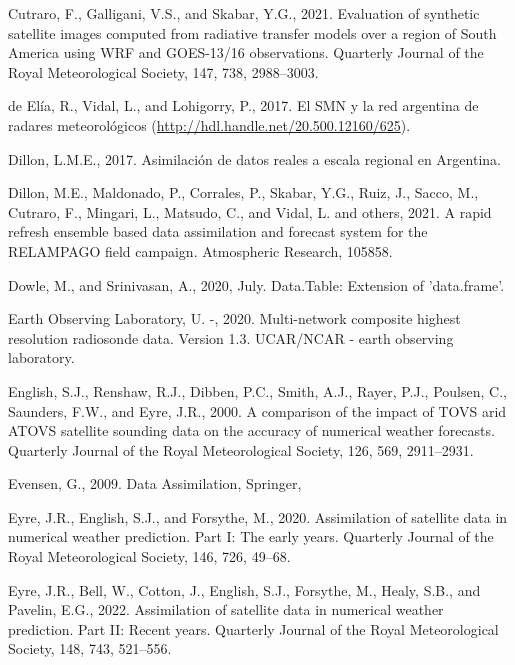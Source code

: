 \documentclass[12pt,oneside]{reedthesis}
\begin{document}
\leavevmode\hypertarget{ref-cutraro2021}{}%
Cutraro, F., Galligani, V.S., and Skabar, Y.G., 2021. Evaluation of synthetic satellite images computed from radiative transfer models over a region of South America using WRF and GOES-13/16 observations. Quarterly Journal of the Royal Meteorological Society, 147, 738, 2988--3003.

\leavevmode\hypertarget{ref-deelia2017}{}%
de Elía, R., Vidal, L., and Lohigorry, P., 2017. El SMN y la red argentina de radares meteorológicos (\url{http://hdl.handle.net/20.500.12160/625}).

\leavevmode\hypertarget{ref-dillon2017}{}%
Dillon, L.M.E., 2017. Asimilación de datos reales a escala regional en Argentina.

\leavevmode\hypertarget{ref-dillon2021}{}%
Dillon, M.E., Maldonado, P., Corrales, P., Skabar, Y.G., Ruiz, J., Sacco, M., Cutraro, F., Mingari, L., Matsudo, C., and Vidal, L. and others, 2021. A rapid refresh ensemble based data assimilation and forecast system for the RELAMPAGO field campaign. Atmospheric Research, 105858.

\leavevmode\hypertarget{ref-dowle2020}{}%
Dowle, M., and Srinivasan, A., 2020, July. Data.Table: Extension of 'data.frame'.

\leavevmode\hypertarget{ref-sondeos}{}%
Earth Observing Laboratory, U. -, 2020. Multi-network composite highest resolution radiosonde data. Version 1.3. UCAR/NCAR - earth observing laboratory.

\leavevmode\hypertarget{ref-english2000}{}%
English, S.J., Renshaw, R.J., Dibben, P.C., Smith, A.J., Rayer, P.J., Poulsen, C., Saunders, F.W., and Eyre, J.R., 2000. A comparison of the impact of TOVS arid ATOVS satellite sounding data on the accuracy of numerical weather forecasts. Quarterly Journal of the Royal Meteorological Society, 126, 569, 2911--2931.

\leavevmode\hypertarget{ref-evensen2009}{}%
Evensen, G., 2009. Data Assimilation, Springer,

\leavevmode\hypertarget{ref-eyre2020}{}%
Eyre, J.R., English, S.J., and Forsythe, M., 2020. Assimilation of satellite data in numerical weather prediction. Part I: The early years. Quarterly Journal of the Royal Meteorological Society, 146, 726, 49--68.

\leavevmode\hypertarget{ref-eyre2022}{}%
Eyre, J.R., Bell, W., Cotton, J., English, S.J., Forsythe, M., Healy, S.B., and Pavelin, E.G., 2022. Assimilation of satellite data in numerical weather prediction. Part II: Recent years. Quarterly Journal of the Royal Meteorological Society, 148, 743, 521--556.
\end{document}
